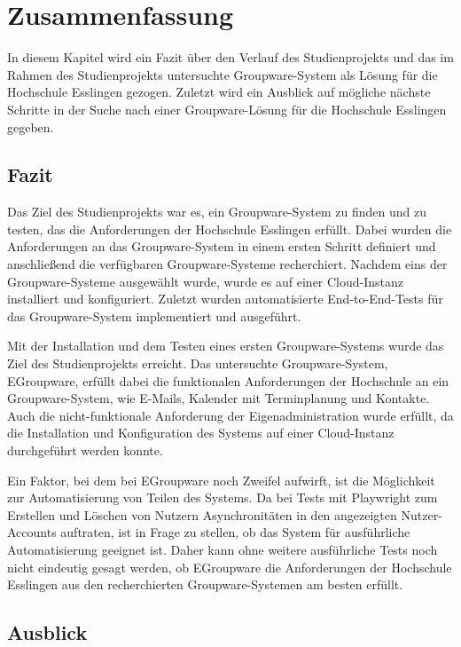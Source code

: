 \chapter{Zusammenfassung}

In diesem Kapitel wird ein Fazit über den Verlauf des Studienprojekts und das im Rahmen des Studienprojekts untersuchte Groupware-System als Lösung für die Hochschule Esslingen gezogen.
Zuletzt wird ein Ausblick auf mögliche nächste Schritte in der Suche nach einer Groupware-Lösung für die Hochschule Esslingen gegeben.

\section{Fazit}

Das Ziel des Studienprojekts war es, ein Groupware-System zu finden und zu testen, das die Anforderungen der Hochschule Esslingen erfüllt.
Dabei wurden die Anforderungen an das Groupware-System in einem ersten Schritt definiert und anschließend die verfügbaren Groupware-Systeme recherchiert.
Nachdem eins der Groupware-Systeme ausgewählt wurde, wurde es auf einer Cloud-Instanz installiert und konfiguriert.
Zuletzt wurden automatisierte End-to-End-Tests für das Groupware-System implementiert und ausgeführt.

Mit der Installation und dem Testen eines ersten Groupware-Systems wurde das Ziel des Studienprojekts erreicht.
Das untersuchte Groupware-System, EGroupware, erfüllt dabei die funktionalen Anforderungen der Hochschule an ein Groupware-System, wie E-Mails, Kalender mit Terminplanung und Kontakte.
Auch die nicht-funktionale Anforderung der Eigenadministration wurde erfüllt, da die Installation und Konfiguration des Systems auf einer Cloud-Instanz durchgeführt werden konnte.

Ein Faktor, bei dem bei EGroupware noch Zweifel aufwirft, ist die Möglichkeit zur Automatisierung von Teilen des Systems.
Da bei Tests mit Playwright zum Erstellen und Löschen von Nutzern Asynchronitäten in den angezeigten Nutzer-Accounts auftraten, ist in Frage zu stellen, ob das System für ausführliche Automatisierung geeignet ist.
Daher kann ohne weitere ausführliche Tests noch nicht eindeutig gesagt werden, ob EGroupware die Anforderungen der Hochschule Esslingen aus den recherchierten Groupware-Systemen am besten erfüllt.


\section{Ausblick}

